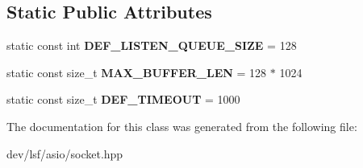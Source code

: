\subsection*{Static Public Attributes}
\begin{DoxyCompactItemize}
\item 
\hypertarget{classlsf_1_1asio_1_1Socket_acccc7de87aaf825185bdffbe836251fe}{
static const int {\bfseries DEF\_\-LISTEN\_\-QUEUE\_\-SIZE} = 128}
\label{classlsf_1_1asio_1_1Socket_acccc7de87aaf825185bdffbe836251fe}

\item 
\hypertarget{classlsf_1_1asio_1_1Socket_acabc64a16cd69168ecae9001bb44c864}{
static const size\_\-t {\bfseries MAX\_\-BUFFER\_\-LEN} = 128 $\ast$ 1024}
\label{classlsf_1_1asio_1_1Socket_acabc64a16cd69168ecae9001bb44c864}

\item 
\hypertarget{classlsf_1_1asio_1_1Socket_a8736d123120a02e242c231d2bf839c42}{
static const size\_\-t {\bfseries DEF\_\-TIMEOUT} = 1000}
\label{classlsf_1_1asio_1_1Socket_a8736d123120a02e242c231d2bf839c42}

\end{DoxyCompactItemize}


The documentation for this class was generated from the following file:\begin{DoxyCompactItemize}
\item 
dev/lsf/asio/socket.hpp\end{DoxyCompactItemize}
